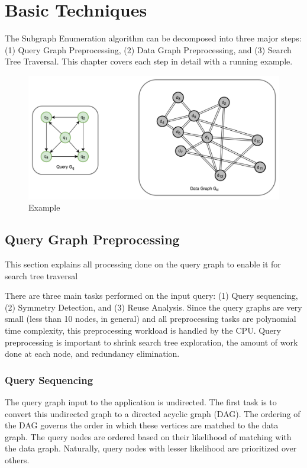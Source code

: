 \chapter{Basic Techniques}\label{chap:basic-theory}

The Subgraph Enumeration algorithm can be decomposed into three major steps: (1) Query Graph Preprocessing, (2) Data Graph Preprocessing, and (3) Search Tree Traversal. This chapter covers each step in detail with a running example.

\begin{figure}
    \includegraphics[width=\textwidth]{fig/LR/sgm-example1.png}
    \caption{Example}
    \label{fig:sgm-example}
\end{figure}
\section{Query Graph Preprocessing}\label{query-preprocessing}
This section explains all processing done on the query graph to enable it for search tree traversal

There are three main tasks performed on the input query: (1) Query sequencing, (2) Symmetry Detection, and (3) Reuse Analysis. Since the query graphs are very small (less than 10 nodes, in general) and all preprocessing tasks are polynomial time complexity, this preprocessing workload is handled by the CPU.
Query preprocessing is important to shrink search tree exploration, the amount of work done at each node, and redundancy elimination.

\subsection{Query Sequencing}
The query graph input to the application is undirected. The first task is to convert this undirected graph to a directed acyclic graph (DAG). The ordering of the DAG governs the order in which these vertices are matched to the data graph.
The query nodes are ordered based on their likelihood of matching with the data graph. Naturally, query nodes with lesser likelihood are prioritized over others.

